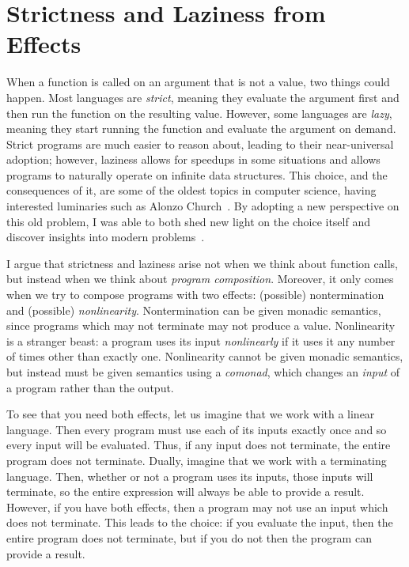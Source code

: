 \documentclass{article}
\theoremstyle{definition}
\begin{document}
\section*{Strictness and Laziness from Effects}

When a function is called on an argument that is not a value, two things could happen.
Most languages are \emph{strict}, meaning they evaluate the argument first and then run the function on the resulting value.
However, some languages are \emph{lazy}, meaning they start running the function and evaluate the argument on demand.
Strict programs are much easier to reason about, leading to their near-universal adoption; however, laziness allows for speedups in some situations and allows programs to naturally operate on infinite data structures.
This choice, and the consequences of it, are some of the oldest topics in computer science, having interested luminaries such as Alonzo Church~\citep{ChurchR36}.
By adopting a new perspective on this old problem, I was able to both shed new light on the choice itself and discover insights into modern problems~\citep{HirschT18}.

I argue that strictness and laziness arise not when we think about function calls, but instead when we think about \emph{program composition}.
Moreover, it only comes when we try to compose programs with two effects: (possible) nontermination and (possible) \emph{nonlinearity}.
Nontermination can be given monadic semantics, since programs which may not terminate may not produce a value.
Nonlinearity is a stranger beast: a program uses its input \emph{nonlinearly} if it uses it any number of times other than exactly one.
Nonlinearity cannot be given monadic semantics, but instead must be given semantics using a \emph{comonad}, which changes an \emph{input} of a program rather than the output.

To see that you need both effects, let us imagine that we work with a linear language.
Then every program must use each of its inputs exactly once and so every input will be evaluated.
Thus, if any input does not terminate, the entire program does not terminate.
Dually, imagine that we work with a terminating language.
Then, whether or not a program uses its inputs, those inputs will terminate, so the entire expression will always be able to provide a result.
However, if you have both effects, then a program may not use an input which does not terminate.
This leads to the choice: if you evaluate the input, then the entire program does not terminate, but if you do not then the program can provide a result.
\end{document}
